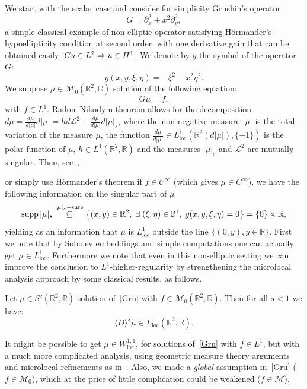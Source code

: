 \documentclass[AHL,Unicode,longabstracts,published]{cedram}
\DeclareMathOperator{\sure}{sure}
\DeclareMathOperator{\supp}{supp}
\DeclareMathOperator{\locc}{loc}
\newcommand{\bbR}{\mathbb{R}}
\newcommand{\bbS}{\mathbb{S}}
\newcommand{\clC}{\mathcal{C}}
\newcommand{\clS}{\mathcal{S}}
\newcommand{\clM}{\mathcal{M}}
\newcommand{\clL}{\mathcal{L}}
\renewcommand*{\implies}{\mathchoice{\Longrightarrow}{\Rightarrow}{\Rightarrow}{\Rightarrow}}
\let\originalleft\left
\let\originalright\right
\renewcommand{\left}{\mathopen{}\mathclose\bgroup\originalleft}
\renewcommand{\right}{\aftergroup\egroup\originalright}
\let\oldexists\exists
\renewcommand*{\exists}{\mathrel{\oldexists}}
\begin{document}
We start with the scalar case and consider for simplicity Grushin's operator
\[
G=\partial_{x}^2+x^2\partial_{y}^2,
\]
a simple classical example of non-elliptic operator satisfying H\"ormander's hypoellipticity condition at second order, with one derivative gain that can be obtained easily: $Gu\in L^2\implies u\in H^1$. We denote by $g$ the symbol of the operator $G$:
\[
g(x,y,\xi,\eta)=-\xi^2-x^2\eta^2.
\]
We suppose $\mu\in \clM_0(\bbR^2,\bbR)$ solution of the following equation:
\begin{equation}\label{Gru}
G\mu=f,
\end{equation}
with $f\in L^1$. Radon--Nikodym theorem allows for the decomposition $d\mu=\frac{d\mu}{d|\mu|}d|\mu|=hd\clL^2+\frac{d\mu}{d|\mu|}d|\mu|_s$, where the non negative measure $|\mu|$ is the total variation of the measure $\mu$, the function $\frac{d\mu}{d|\mu|}\in L^1_{\locc}(\bbR^2 (d|\mu|), \{\pm 1\})$ is the polar function of $\mu$, ${h\in L^1(\bbR^2,\bbR)}$ and the measures $|\mu|_s$ and $\clL^2$ are mutually singular. Then, see~\cite{DePRi},

\pagebreak{}
or simply use H\"ormander's theorem if $f\in\clC^\infty$ (which gives $\mu\in C^\infty$), we have the following information on the singular part of $\mu$
\[
\supp |\mu|_s\overset{|\mu|_s-\sure}\subseteq 
\left\{(x,y)\in\bbR^2, \;\exists (\xi,\eta)\in\bbS^1, \; g(x,y,\xi,\eta)=0\right\}= \{0\}\times\bbR,
\]
yielding as an information that $\mu$ is $L^1_{\locc}$ outside the line $\{(0,y),y\in\bbR\}$. First we note that by Sobolev embeddings and simple computations one can actually get $ \mu\in L^1_{\locc}$. Furthermore we note that even in this non-elliptic setting we can improve the conclusion to $L^1$-higher-regularity by strengthening the microlocal analysis approach by some classical results, as follows.

\begin{theo}\label{th}
Let $\mu\in \clS'(\bbR^2,\bbR)$ solution of~\eqref{Gru} with $f\in\clM_0(\bbR^2,\bbR)$. Then for all $s<1$ we have:
\[
\langle D\rangle^{s}\mu\in L^1_{\locc}(\bbR^2,\bbR).
\]
\end{theo}
\begin{rema}
It might be possible to get $\mu\in W^{1,1}_{\locc}$, for solutions of~\eqref{Gru} with $f\in L^1$, but with a much more complicated analysis, using geometric measure theory arguments and microlocal refinements as in~\cite{BBWFL1}. Also, we made a \emph{global} assumption in~\eqref{Gru} ($f \in \clM_0$), which at the price of little complication could be weakened ($f\in \clM$).
\end{rema}
\end{document}

